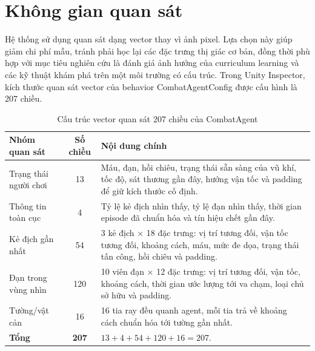 \section{Không gian quan sát}

Hệ thống sử dụng quan sát dạng vector thay vì ảnh pixel. Lựa chọn này giúp giảm chi phí mẫu, tránh phải học lại các đặc trưng thị giác cơ bản, đồng thời phù hợp với mục tiêu nghiên cứu là đánh giá ảnh hưởng của curriculum learning và các kỹ thuật khám phá trên một môi trường có cấu trúc. Trong Unity Inspector, kích thước quan sát vector của behavior CombatAgentConfig được cấu hình là 207 chiều.

\begin{table}[H]
    \centering
    \small
    \caption{Cấu trúc vector quan sát 207 chiều của CombatAgent}
    \label{tab:obs_207}
    \begin{tabular}{|p{4cm}|c|p{8cm}|}
        \hline
        \textbf{Nhóm quan sát} & \textbf{Số chiều} & \textbf{Nội dung chính} \\
        \hline
        Trạng thái người chơi & 13 & Máu, đạn, hồi chiêu, trạng thái sẵn sàng của vũ khí, tốc độ, sát thương gần đây, hướng vận tốc và padding để giữ kích thước cố định. \\
        \hline
        Thông tin toàn cục & 4 & Tỷ lệ kẻ địch nhìn thấy, tỷ lệ đạn nhìn thấy, thời gian episode đã chuẩn hóa và tín hiệu chết gần đây. \\
        \hline
        Kẻ địch gần nhất & 54 & 3 kẻ địch $\times$ 18 đặc trưng: vị trí tương đối, vận tốc tương đối, khoảng cách, máu, mức đe dọa, trạng thái tấn công, hồi chiêu và padding. \\
        \hline
        Đạn trong vùng nhìn & 120 & 10 viên đạn $\times$ 12 đặc trưng: vị trí tương đối, vận tốc, khoảng cách, thời gian ước lượng tới va chạm, loại chủ sở hữu và padding. \\
        \hline
        Tường/vật cản & 16 & 16 tia ray đều quanh agent, mỗi tia trả về khoảng cách chuẩn hóa tới tường gần nhất. \\
        \hline
        \textbf{Tổng} & \textbf{207} & $13 + 4 + 54 + 120 + 16 = 207$. \\
        \hline
    \end{tabular}
\end{table}

